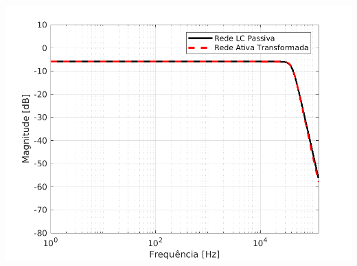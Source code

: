 \documentclass{article}
\begin{document}
\begin{center}
\centering
  \includegraphics[scale=0.5]{img/magnitude.png}
\end{center}
\end{document}
